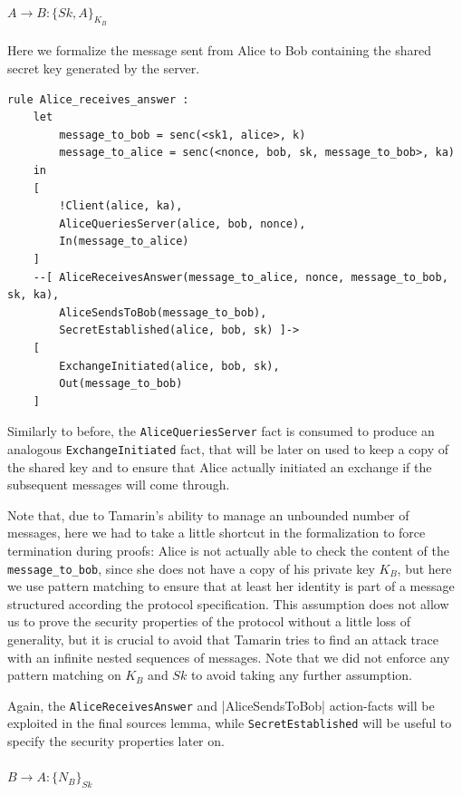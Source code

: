 \documentclass[fleqn,10pt]{SelfArx} %
\begin{document}
\paragraph{$A \to B: \{Sk, A\}_{K_B}$}

Here we formalize the message sent from Alice to Bob containing the shared secret key generated by the server.

\begin{lstlisting}[language=Tamarin]
rule Alice_receives_answer :
    let
        message_to_bob = senc(<sk1, alice>, k)
        message_to_alice = senc(<nonce, bob, sk, message_to_bob>, ka)
    in
    [
        !Client(alice, ka),
        AliceQueriesServer(alice, bob, nonce),
        In(message_to_alice)
    ]
    --[ AliceReceivesAnswer(message_to_alice, nonce, message_to_bob, sk, ka),
        AliceSendsToBob(message_to_bob),
        SecretEstablished(alice, bob, sk) ]->
    [
        ExchangeInitiated(alice, bob, sk),
        Out(message_to_bob)
    ]
\end{lstlisting}

Similarly to before, the \lstinline|AliceQueriesServer| fact is consumed to produce an analogous \lstinline|ExchangeInitiated| fact, that will be later on used to keep a copy of the shared key and to ensure that Alice actually initiated an exchange if the subsequent messages will come through.

Note that, due to Tamarin's ability to manage an unbounded number of messages, here we had to take a little shortcut in the formalization to force termination during proofs: Alice is not actually able to check the content of the \lstinline|message_to_bob|, since she does not have a copy of his private key $K_B$, but here we use pattern matching to ensure that at least her identity is part of a message structured according the protocol specification. This assumption does not allow us to prove the security properties of the protocol without a little loss of generality, but it is crucial to avoid that Tamarin tries to find an attack trace with an infinite nested sequences of messages. Note that we did not enforce any pattern matching on $K_B$ and $Sk$ to avoid taking any further assumption.

Again, the \lstinline|AliceReceivesAnswer| and |AliceSendsToBob| action-facts will be exploited in the final sources lemma, while \lstinline|SecretEstablished| will be useful to specify the security properties later on.

\paragraph{$B \to A: \{N_B\}_{Sk}$}
\end{document}
